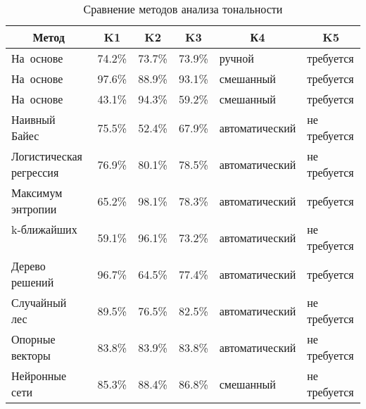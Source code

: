 \clearpage
\noindent
\captionsetup{format=hang,justification=raggedright,
              singlelinecheck=off,width=16.8cm}
\begin{longtable}[Hc]{|p{3.2cm}|p{1.5cm}|p{1.5cm}|p{1.5cm}|p{3.5cm}|p{3cm}|}
\caption{Сравнение методов анализа тональности\label{tab:02}}\\
    \hline
    \multicolumn{1}{|c}{\textbf{Метод}} & \multicolumn{1}{|c|}{\textbf{K1}} &
    \multicolumn{1}{c|}{\textbf{K2}} & \multicolumn{1}{c}{\textbf{K3}} &
    \multicolumn{1}{|c|}{\textbf{К4}} & \multicolumn{1}{c|}{\textbf{K5}}\\
    \hline
    \mbox{На~основе}
    ~\cite{article10}    & 74.2\% & 73.7\% & 73.9\%
                                     & ручной & требуется \\*
    \hline
    \mbox{На~основе}
    ~\cite{article22}  & 97.6\% & 88.9\% & 93.1\%
                                     & смешанный & требуется\\*
    \hline
    \mbox{На~основе}
    ~\cite{article23}  & 43.1\% & 94.3\% & 59.2\%
                                     & смешанный & требуется\\*
    \hline
    Наивный\linebreak
    Байес~\cite{article21}               & 75.5\% & 52.4\% & 67.9\%
                                     & автоматический & не требуется\\*
    \hline
    Логистическая
    регрессия ~\cite{article21}          & 76.9\% & 80.1\% & 78.5\%
                                     & автоматический & не требуется\\
    \hline
    Максимум\linebreak
    энтропии~\cite{article19}            & 65.2\% & 98.1\% & 78.3\%
                                     & автоматический & требуется\\
    \hline
    k-ближайших
    ~\cite{article21}   & 59.1\% & 96.1\% & 73.2\%
                                     & автоматический & не требуется\\
    \hline
    Дерево\linebreak
    решений~\cite{article21}             & 96.7\% & 64.5\% & 77.4\%
                                     & автоматический & требуется\\
    \hline
    Случайный лес~\cite{article21}       & 89.5\% & 76.5\% & 82.5\%
                                     & автоматический & не требуется\\
    \hline
    Опорные\linebreak
    векторы~\cite{article19}             & 83.8\% & 83.9\% & 83.8\%
                                     & автоматический & не требуется\\
    \hline
    Нейронные\linebreak
    сети~\cite{article21}                & 85.3\% & 88.4\% & 86.8\%
                                     & смешанный & не требуется \\
    \hline
\end{longtable}

